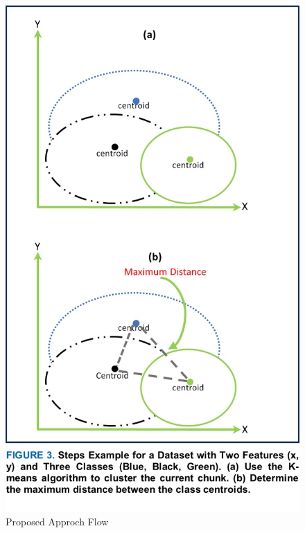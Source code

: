 \begin{figure}[!ht]
	\centering
	\includegraphics[width=1\linewidth]{5_Emerging/figures/scenario1.png}
	\caption{Proposed Approch Flow}
	\label{fig:5_scenario1}
\end{figure}
